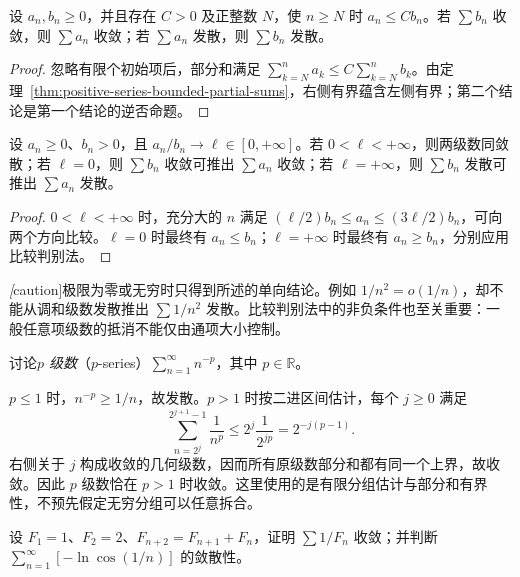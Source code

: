 \begin{theorem}[比较判别法]
\label{thm:series-comparison-test}
设 $a_n,b_n\geq0$，并且存在 $C>0$ 及正整数 $N$，使 $n\geq N$ 时 $a_n\leq Cb_n$。若 $\sum b_n$ 收敛，则 $\sum a_n$ 收敛；若 $\sum a_n$ 发散，则 $\sum b_n$ 发散。
\end{theorem}

\begin{proof}
忽略有限个初始项后，部分和满足 $\sum_{k=N}^n a_k\leq C\sum_{k=N}^n b_k$。由定理~\ref{thm:positive-series-bounded-partial-sums}，右侧有界蕴含左侧有界；第二个结论是第一个结论的逆否命题。
\end{proof}

\begin{corollary}[极限比较判别法]
\label{cor:series-limit-comparison-test}
设 $a_n\geq0$、$b_n>0$，且 $a_n/b_n\to\ell\in[0,+\infty]$。若 $0<\ell<+\infty$，则两级数同敛散；若 $\ell=0$，则 $\sum b_n$ 收敛可推出 $\sum a_n$ 收敛；若 $\ell=+\infty$，则 $\sum b_n$ 发散可推出 $\sum a_n$ 发散。
\end{corollary}

\begin{proof}
$0<\ell<+\infty$ 时，充分大的 $n$ 满足 $(\ell/2)b_n\leq a_n\leq(3\ell/2)b_n$，可向两个方向比较。$\ell=0$ 时最终有 $a_n\leq b_n$；$\ell=+\infty$ 时最终有 $a_n\geq b_n$，分别应用比较判别法。
\end{proof}

\emph[caution]{极限为零或无穷时只得到所述的单向结论。}例如 $1/n^2=o(1/n)$，却不能从调和级数发散推出 $\sum1/n^2$ 发散。比较判别法中的非负条件也至关重要：一般任意项级数的抵消不能仅由通项大小控制。

\begin{example}
\label{ex:p-series-convergence}
讨论\emph{$p$ 级数}（$p$-series）$\sum_{n=1}^{\infty}n^{-p}$，其中 $p\in\mathbb R$。
\end{example}

\begin{solve}
$p\leq1$ 时，$n^{-p}\geq1/n$，故发散。$p>1$ 时按二进区间估计，每个 $j\geq0$ 满足
\[
    \sum_{n=2^j}^{2^{j+1}-1}\frac1{n^p}
    \leq 2^j\frac1{2^{jp}}=2^{-j(p-1)}.
\]
右侧关于 $j$ 构成收敛的几何级数，因而所有原级数部分和都有同一个上界，故收敛。因此 $p$ 级数恰在 $p>1$ 时收敛。这里使用的是有限分组估计与部分和有界性，不预先假定无穷分组可以任意拆合。
\end{solve}

\begin{example}
\label{ex:comparison-series-fibonacci-and-logcos}
设 $F_1=1$、$F_2=2$、$F_{n+2}=F_{n+1}+F_n$，证明 $\sum1/F_n$ 收敛；并判断 $\sum_{n=1}^{\infty}[-\ln\cos(1/n)]$ 的敛散性。
\end{example}

